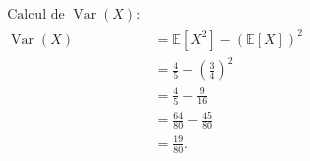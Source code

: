 {\begin{enumerate}
{\begin{align*}
	\text{Calcul de } \operatorname{Var}(X): \\
	\operatorname{Var}(X) &= \mathbb{E}[X^2] - (\mathbb{E}[X])^2 \\
	&= \frac{4}{5} - \left( \frac{3}{4} \right)^2 \\
	&= \frac{4}{5} - \frac{9}{16} \\
	&= \frac{64}{80} - \frac{45}{80} \\
	&= \frac{19}{80}.
\end{align*}
 }
\end{enumerate}
}
